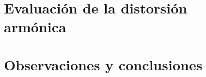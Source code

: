\section{Evaluación de la distorsión armónica}
\resetallcounters

\clearpage


\section{Observaciones y conclusiones}
\resetallcounters

\cleardoublepage


